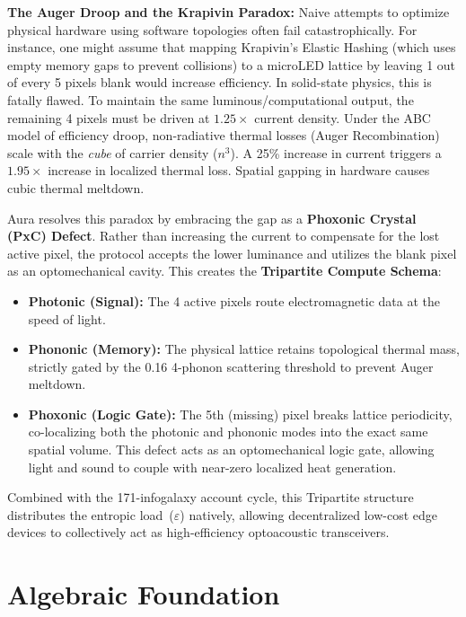 \documentclass[12pt,a4paper]{article}
\begin{document}
\textbf{The Auger Droop and the Krapivin Paradox:} Naive attempts to optimize physical hardware using software topologies often fail catastrophically. For instance, one might assume that mapping Krapivin's Elastic Hashing (which uses empty memory gaps to prevent collisions) to a microLED lattice by leaving 1 out of every 5 pixels blank would increase efficiency. In solid-state physics, this is fatally flawed. To maintain the same luminous/computational output, the remaining 4 pixels must be driven at $1.25\times$ current density. Under the ABC model of efficiency droop, non-radiative thermal losses (Auger Recombination) scale with the \emph{cube} of carrier density ($n^3$). A 25\% increase in current triggers a $1.95\times$ increase in localized thermal loss. Spatial gapping in hardware causes cubic thermal meltdown.

Aura resolves this paradox by embracing the gap as a \textbf{Phoxonic Crystal (PxC) Defect}. Rather than increasing the current to compensate for the lost active pixel, the protocol accepts the lower luminance and utilizes the blank pixel as an optomechanical cavity. This creates the \textbf{Tripartite Compute Schema}:
\begin{itemize}
    \item \textbf{Photonic (Signal):} The 4 active pixels route electromagnetic data at the speed of light.
    \item \textbf{Phononic (Memory):} The physical lattice retains topological thermal mass, strictly gated by the 0.16 4-phonon scattering threshold to prevent Auger meltdown.
    \item \textbf{Phoxonic (Logic Gate):} The 5th (missing) pixel breaks lattice periodicity, co-localizing both the photonic and phononic modes into the exact same spatial volume. This defect acts as an optomechanical logic gate, allowing light and sound to couple with near-zero localized heat generation.
\end{itemize}

Combined with the 171-infogalaxy account cycle, this Tripartite structure distributes the entropic load~($\varepsilon$) natively, allowing decentralized low-cost edge devices to collectively act as high-efficiency optoacoustic transceivers.

\section{Algebraic Foundation}
\label{sec:algebra}
\end{document}
